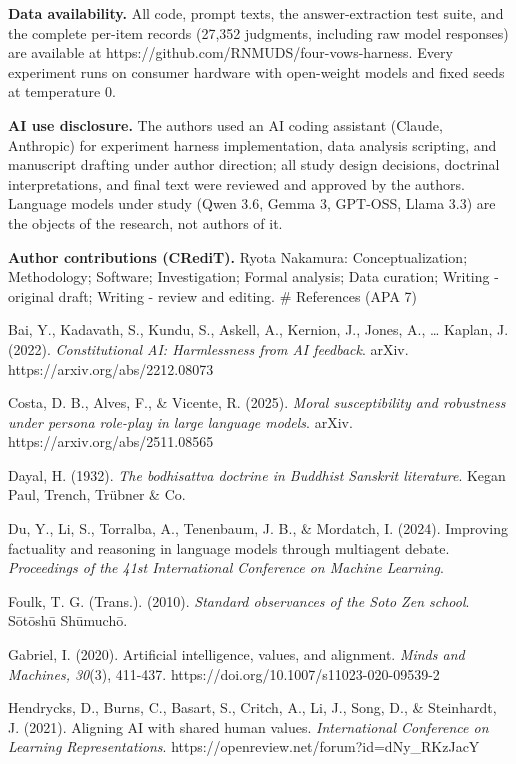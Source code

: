 \documentclass[
  11pt,
]{article}
\begin{document}
\textbf{Data availability.} All code, prompt texts, the
answer-extraction test suite, and the complete per-item records (27,352
judgments, including raw model responses) are available at
https://github.com/RNMUDS/four-vows-harness. Every experiment runs on
consumer hardware with open-weight models and fixed seeds at temperature
0.

\textbf{AI use disclosure.} The authors used an AI coding assistant
(Claude, Anthropic) for experiment harness implementation, data analysis
scripting, and manuscript drafting under author direction; all study
design decisions, doctrinal interpretations, and final text were
reviewed and approved by the authors. Language models under study (Qwen
3.6, Gemma 3, GPT-OSS, Llama 3.3) are the objects of the research, not
authors of it.

\textbf{Author contributions (CRediT).} Ryota Nakamura:
Conceptualization; Methodology; Software; Investigation; Formal
analysis; Data curation; Writing - original draft; Writing - review and
editing. \# References (APA 7)

Bai, Y., Kadavath, S., Kundu, S., Askell, A., Kernion, J., Jones, A.,
\ldots{} Kaplan, J. (2022). \emph{Constitutional AI: Harmlessness from
AI feedback}. arXiv. https://arxiv.org/abs/2212.08073

Costa, D. B., Alves, F., \& Vicente, R. (2025). \emph{Moral
susceptibility and robustness under persona role-play in large language
models}. arXiv. https://arxiv.org/abs/2511.08565

Dayal, H. (1932). \emph{The bodhisattva doctrine in Buddhist Sanskrit
literature}. Kegan Paul, Trench, Trübner \& Co.

Du, Y., Li, S., Torralba, A., Tenenbaum, J. B., \& Mordatch, I. (2024).
Improving factuality and reasoning in language models through multiagent
debate. \emph{Proceedings of the 41st International Conference on
Machine Learning}.

Foulk, T. G. (Trans.). (2010). \emph{Standard observances of the Soto
Zen school}. Sōtōshū Shūmuchō.

Gabriel, I. (2020). Artificial intelligence, values, and alignment.
\emph{Minds and Machines, 30}(3), 411-437.
https://doi.org/10.1007/s11023-020-09539-2

Hendrycks, D., Burns, C., Basart, S., Critch, A., Li, J., Song, D., \&
Steinhardt, J. (2021). Aligning AI with shared human values.
\emph{International Conference on Learning Representations}.
https://openreview.net/forum?id=dNy\_RKzJacY
\end{document}
